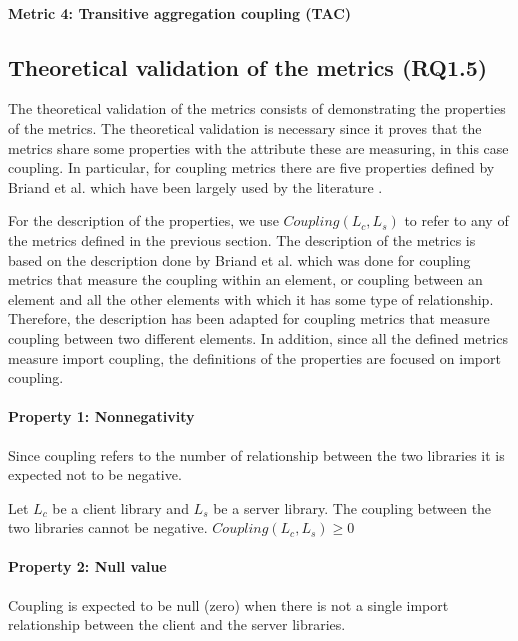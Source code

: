 \paragraph{Metric 4: Transitive aggregation coupling (TAC)}


\subsection{Theoretical validation of the metrics (RQ1.5)}
The theoretical validation of the metrics consists of demonstrating the properties of the metrics. The theoretical validation is necessary since it proves that the metrics share some properties with the attribute these are measuring, in this case coupling. In particular, for coupling metrics there are five properties defined by Briand et al. \cite{briand1996property} which have been largely used by the literature \cite{poshyvanyk2006conceptual, allen1999measuring, zhao2004measuring}.

For the description of the properties, we use $Coupling(L_c, L_s)$ to refer to any of the metrics defined in the previous section. The description of the metrics is based on the description done by Briand et al. which was done for coupling metrics that measure the coupling within an element, or coupling between an element and all the other elements with which it has some type of relationship. Therefore, the description has been adapted for coupling metrics that measure coupling between two different elements. In addition, since all the defined metrics measure import coupling, the definitions of the properties are focused on import coupling.

\paragraph{Property 1: Nonnegativity}
Since coupling refers to the number of relationship between the two libraries it is expected not to be negative.

Let $L_c$ be a client library and $L_s$ be a server library. The coupling between the two libraries cannot be negative. $Coupling(L_c, L_s) \ge 0$

\paragraph{Property 2: Null value}
Coupling is expected to be null (zero) when there is not a single import relationship between the client and the server libraries.

